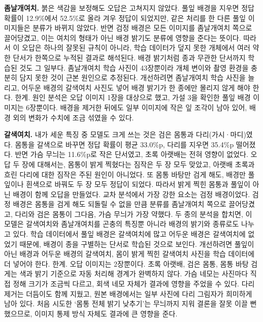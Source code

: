 \documentclass[11pt]{article}
\begin{document}
\textbf{좀날개여치.} 붉은 색감을 보정해도 오답은 고쳐지지 않았다. 풀잎 배경을 지우면 정답 확률이 12.9\%에서 52.5\%로 올라 겨우 정답이 되었지만, 같은 처리를 한 다른 풀잎 이미지들은 분류가 바뀌지 않았다. 반면 검정 배경은 모든 이미지를 좀날개여치 쪽으로 끌어당겼고, 이는 여치의 형태가 아닌 배경 밝기도 분류에 영향을 준다는 뜻이다.
따라서 이 오답은 하나의 잘못된 규칙이 아니라, 학습 데이터가 덮지 못한 개체에서 여러 약한 단서가 한쪽으로 누적된 결과로 해석된다. 배경 밝기처럼 종과 무관한 단서까지 학습된 것도 그 일부다. 좀날개여치 학습 사진이 43장뿐이라 개체 변이와 촬영 환경을 충분히 담지 못한 것이 근본 원인으로 추정된다.
개선하려면 좀날개여치 학습 사진을 늘리고, 어두운 배경의 갈색여치 사진도 넣어 배경 밝기가 한 종에만 몰리지 않게 해야 한다.
한계. 원인 분석은 오답 이미지 1장을 대상으로 했고, 가설 3을 확인한 풀잎 배경 이미지는 6장뿐이다. 배경을 제거한 뒤에도 일부 이미지에 작은 잎 조각이 남아 있어, 배경 외의 변화가 수치에 조금 섞였을 수 있다.

\textbf{갈색여치.} 내가 세운 특징 중 모델도 크게 쓰는 것은 검은 몸통과 다리(가시·마디)였다. 몸통을 갈색으로 바꾸면 정답 확률이 평균 33.0\%p, 다리를 지우면 35.4\%p 떨어졌다. 반면 가슴 무늬는 11.6\%p로 작은 단서였고, 초록 아랫배는 전혀 영향이 없었다.
오답 두 장에 대해서는, 몸통이 밝게 찍혔다는 짐작은 두 장 모두 맞았고, 아랫배 초록과 흐린 다리에 대한 짐작은 주된 원인이 아니었다. 또 몸통 바탕만 검게 해도, 배경만 풀잎이나 흰색으로 바꿔도 두 장 모두 정답이 되었다. 따라서 밝게 찍힌 몸통과 풀잎이 아닌 배경이 함께 오답을 만들었다.
교차 분석에서 가장 강한 요소는 검정 배경이었다. 검정 배경은 몸통을 검게 해도 되돌릴 수 없을 만큼 분류를 좀날개여치 쪽으로 끌어당겼고, 다리와 검은 몸통이 그다음, 가슴 무늬가 가장 약했다. 두 종의 분석을 합치면, 이 모델은 갈색여치와 좀날개여치를 곤충의 특징뿐 아니라 배경의 밝기와 종류로도 나누고 있다. 학습 데이터에서 풀잎 배경은 갈색여치에 많고 어두운 배경은 갈색여치에 없었기 때문에, 배경이 종을 구별하는 단서로 학습된 것으로 보인다. 개선하려면 풀잎이 아닌 배경과 어두운 배경의 갈색여치, 몸이 밝게 찍힌 갈색여치 사진을 학습 데이터에 더 넣어야 한다.
한계. 오답 이미지는 2장뿐이다. 초록 아랫배, 검은 몸통, 몸통 바탕 검게는 색과 밝기 기준으로 자동 처리해 경계가 완벽하지 않다. 가슴 네모는 사진마다 직접 정해 크기가 조금씩 다르고, 회색 네모 자체가 결과에 영향을 주었을 수 있다. 다리 제거는 더듬이도 함께 지웠고, 원본 배경에서는 일부 사진에 다리 그림자가 희미하게 남아 있다. 처음 시도한 `몸통 전체 밝기 낮추기'는 무늬까지 지워 결론을 잘못 이끌 뻔했으므로, 이미지 통제 방식 자체도 결과에 큰 영향을 준다.
\end{document}
